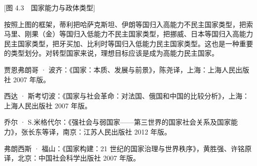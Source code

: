 [图 4.3　国家能力与政体类型]

按照上图的框架，蒂利把哈萨克斯坦、伊朗等国归入高能力不民主国家类型，把索马里、刚果（金）等国归入低能力不民主国家类型，把挪威、日本等国归入高能力民主国家类型，把牙买加、比利时等国归入低能力民主国家类型。这也是一种重要的类型划分。对转型国家来说，理想目标应该是成为高能力民主国家。


贾恩弗朗哥 · 波齐：《国家：本质、发展与前景》，陈尧译，上海：上海人民出版社 2007 年版。

西达 · 斯考切波：《国家与社会革命：对法国、俄国和中国的比较分析》，上海：上海人民出版社 2007 年版。

乔尔 · S.米格代尔：《强社会与弱国家——第三世界的国家社会关系及国家能力》，张长东等译，南京：江苏人民出版社 2012 年版。

弗朗西斯 · 福山：《国家构建：21 世纪的国家治理与世界秩序》，黄胜强、许铭原译，北京：中国社会科学出版社 2007 年版。
